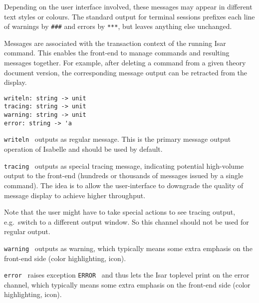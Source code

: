 \begin{isabellebody}
\begin{isamarkuptext}
  Depending on the user interface involved, these messages may appear
  in different text styles or colours.  The standard output for
  terminal sessions prefixes each line of warnings by \verb|###| and errors by \verb|***|, but leaves anything else
  unchanged.

  Messages are associated with the transaction context of the running
  Isar command.  This enables the front-end to manage commands and
  resulting messages together.  For example, after deleting a command
  from a given theory document version, the corresponding message
  output can be retracted from the display.%
\end{isamarkuptext}%
\isamarkuptrue%
%
\isadelimmlref
%
\endisadelimmlref
%
\isatagmlref
%
\begin{isamarkuptext}%
\begin{mldecls}
  \verb|writeln: string -> unit| \\
  \verb|tracing: string -> unit| \\
  \verb|warning: string -> unit| \\
  \verb|error: string -> 'a| \\
  \end{mldecls}

  \begin{description}

  \item \verb|writeln|~ outputs  as regular
  message.  This is the primary message output operation of Isabelle
  and should be used by default.

  \item \verb|tracing|~ outputs  as special
  tracing message, indicating potential high-volume output to the
  front-end (hundreds or thousands of messages issued by a single
  command).  The idea is to allow the user-interface to downgrade the
  quality of message display to achieve higher throughput.

  Note that the user might have to take special actions to see tracing
  output, e.g.\ switch to a different output window.  So this channel
  should not be used for regular output.

  \item \verb|warning|~ outputs  as
  warning, which typically means some extra emphasis on the front-end
  side (color highlighting, icon).

  \item \verb|error|~ raises exception \verb|ERROR|~ and thus lets the Isar toplevel print  on the
  error channel, which typically means some extra emphasis on the
  front-end side (color highlighting, icon).


\end{description}
\end{isamarkuptext}
\end{isabellebody}
